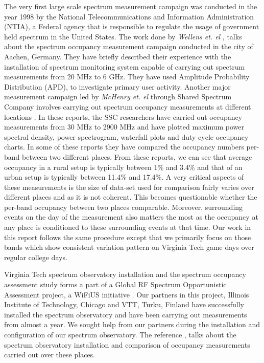 \documentclass[12pt,sts]{report}
\begin{document}
The very first large scale spectrum measurement campaign was conducted in the year 1998 \cite{750342} by the National Telecommunications and Information Administration (NTIA), a Federal agency that is responsible to regulate the usage of government held spectrum in the United States. The work done by \textit{Wellens et. el} \cite{4549835}, talks about the spectrum occupancy measurement campaign conducted in the city of Aachen, Germany. They have briefly described their experience with the installation of spectrum monitoring system capable of carrying out spectrum measurements from 20 MHz to 6 GHz. They have used Amplitude Probability Distribution (APD), to investigate primary user activity. Another major measurement campaign led by \textit{McHenry et. el} \cite{McHenry:2006:CSO:1234388.1234389} through Shared Spectrum Company involves carrying out spectrum occupancy measurements at different locations \cite{SSCSpecReports}. In these reports, the SSC researchers have carried out occupancy measurements from 30 MHz to 2900 MHz and have plotted maximum power spectral density, power spectrogram, waterfall plots and duty-cycle occupancy charts.  In some of these reports they have compared the occupancy numbers per-band between two different places. From these reports, we can see that average occupancy in a rural setup is typically between 1\% and 3.4\% and that of an urban setup is typically between 11.4\% and 17.4\%. A very critical aspects of these measurements is the size of data-set used for comparison fairly varies over different places and as it is not coherent. This becomes questionable whether the per-band occupancy between two places comparable. Moreover, surrounding events on the day of the measurement also matters the most as the occupancy at any place is conditioned to these surrounding events at that time. Our work in this report follows the same procedure except that we primarily focus on those bands which show consistent variation pattern on Virginia Tech game days over regular college days. 

Virginia Tech spectrum observatory installation and the spectrum occupancy assessment study forms a part of a Global RF Spectrum Opportunistic Assessment project, a WiFiUS initiative \cite{HAGER_GRANT}. Our partners in this project, Illinois Institute of Technology, Chicago and VTT, Turku, Finland have successfully installed the spectrum observatory and have been carrying out measurements from almost a year. We sought help from our partners during the installation and configuration of our spectrum observatory. The reference \cite{6849666}, talks about the spectrum observatory installation and comparison of occupancy measurements carried out over these places.
\end{document}
